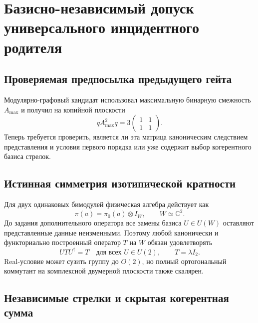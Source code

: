 \chapter{Базисно-независимый допуск универсального инцидентного родителя}
\label{ch:v7-universal-incidence-parent-admissibility-gate}

\section{Проверяемая предпосылка предыдущего гейта}

Модулярно-графовый кандидат использовал максимальную бинарную смежность
$A_{\max}$ и получил на копийной плоскости
\begin{equation}
 qA_{\max}^2q
 =3\begin{pmatrix}1&1\\1&1\end{pmatrix}.
 \label{eq:v7-incidence-labeled-square}
\end{equation}
Теперь требуется проверить, является ли эта матрица каноническим следствием
представления и условия первого порядка или уже содержит выбор когерентного
базиса стрелок.

\section{Истинная симметрия изотипической кратности}

Для двух одинаковых бимодулей физическая алгебра действует как
\begin{equation}
 \pi(a)=\pi_0(a)\otimes I_W,
 \qquad W\simeq\mathbb C^2.
 \label{eq:v7-incidence-isotypic-action}
\end{equation}
До задания дополнительного оператора все замены базиса $U\in U(W)$ оставляют
представленные данные неизменными. Поэтому любой канонически и функториально
построенный оператор $T$ на $W$ обязан удовлетворять
\begin{equation}
 UTU^\dagger=T\quad\text{для всех }U\in U(2),
 \qquad T=\lambda I_2.
 \label{eq:v7-incidence-naturality-schur}
\end{equation}
Real-условие может сузить группу до $O(2)$, но полный ортогональный
коммутант на комплексной двумерной плоскости также скалярен.

\section{Независимые стрелки и скрытая когерентная сумма}

